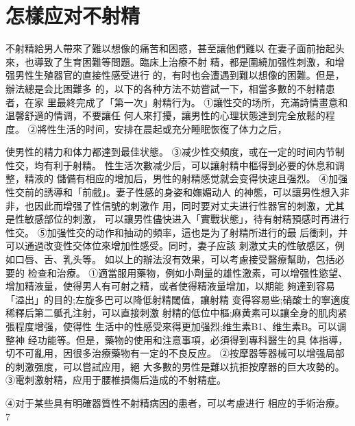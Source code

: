 \documentclass[12pt,UTF8]{ctexbook}
\begin{document}
\section{怎樣应对不射精}
不射精給男人帶來了難以想像的痛苦和困惑，甚至讓他們難以
在妻子面前抬起头來，也導致了生育困難等問題。臨床上治療不射
精，都是圍繞加强性刺激，和增强男性生殖器官的直接性感受进行
的，有时也会遭遇到難以想像的困難。但是，辦法總是会比困難多
的，以下的各种方法不妨嘗試一下，相當多數的不射精患者，在家
里最終完成了「第一次」射精行为。
①讓性交的场所，充滿詩情畫意和温馨舒適的情调，不要讓任
何人來打擾，讓男性的心理状態達到完全放鬆的程度。
②將性生活的时间，安排在晨起或充分睡眠恢復了体力之后，

使男性的精力和体力都達到最佳状態。
③减少性交頻度，或在一定的时间内节制性交，均有利于射精。
性生活次數减少后，可以讓射精中樞得到必要的休息和调整，精液的
儲備有相应的增加后，男性的射精感觉就会变得快速且强烈。
④加强性交前的誘導和「前戲」。妻子性感的身姿和嫵媚动人
的神態，可以讓男性想入非非，也因此而增强了性信號的刺激作
用，同时要对丈夫进行性器官的刺激，尤其是性敏感部位的刺激，
可以讓男性儘快进入「實戰状態」，待有射精預感时再进行性交。
⑤加强性交的动作和抽动的頻率，這也是为了射精所进行的最
后衝刺，并可以通過改变性交体位來增加性感受。同时，妻子应該
刺激丈夫的性敏感区，例如口唇、舌、乳头等。
如以上的辦法沒有效果，可以考慮接受醫療幫助，包括必要的
检查和治療。
①適當服用藥物，例如小劑量的雄性激素，可以增强性慾望、
增加精液量，使得男人有可射之精，或者使得精液量增加，以期能
夠達到容易「溢出」的目的;左旋多巴可以降低射精閾值，讓射精
变得容易些;硝酸士的寧適度稀釋后第二骶孔注射，可以直接刺激
射精的低位中樞;麻黄素可以讓全身的肌肉紧張程度增强，使得性
生活中的性感受來得更加强烈;维生素B1、维生素B。可以调整神
经功能等。但是，藥物的使用和注意事項，必須得到專科醫生的具
体指導，切不可亂用，因很多治療藥物有一定的不良反应。
②按摩器等器械可以增强局部的刺激强度，可以嘗試应用，絕
大多數的男性是難以抗拒按摩器的巨大攻勢的。
③電刺激射精，应用于腰椎損傷后造成的不射精症。

④对于某些具有明確器質性不射精病因的患者，可以考慮进行
相应的手術治療。
7
\end{document}

